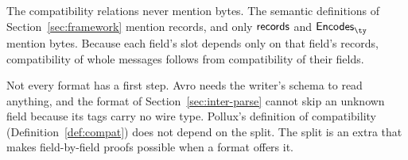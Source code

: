 The compatibility relations never mention bytes. The semantic definitions of
Section~\ref{sec:framework} mention records, and only $\mathsf{records}$ and
$\encodes{\ty}$ mention bytes. Because each field's slot depends only on that
field's records, compatibility of whole messages follows from compatibility of
their fields.

Not every format has a first step. Avro needs the writer's schema to read
anything, and the format of Section~\ref{sec:inter-parse} cannot skip an unknown
field because its tags carry no wire type. Pollux's definition of compatibility
(Definition~\ref{def:compat}) does not depend on the split. The split is an
extra that makes field-by-field proofs possible when a format offers it.

